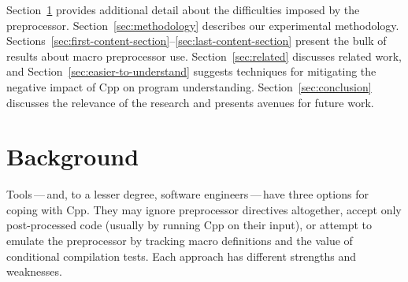 \documentclass[10pt]{article}
\begin{document}
Section~\ref{sec:background} provides additional detail about the
difficulties imposed by the preprocessor.
Section~\ref{sec:methodology} describes our experimental methodology.
Sections~\ref{sec:first-content-section}--\ref{sec:last-content-section}
present the bulk of results about macro preprocessor use.
Section~\ref{sec:related} discusses related work, and
Section~\ref{sec:easier-to-understand} suggests techniques for mitigating
the negative impact of Cpp on program understanding.
Section~\ref{sec:conclusion} discusses the relevance of the research and
presents avenues for future work.

\section{Background}\label{sec:background}

Tools\,---\,and, to a lesser degree, software engineers\,---\,have
three options for coping with Cpp.  They may ignore preprocessor
directives altogether, accept only post-processed code (usually by
running Cpp on their input), or attempt to emulate the preprocessor by
tracking macro definitions and the value of conditional compilation tests.
Each approach has different strengths and weaknesses.
\end{document}

